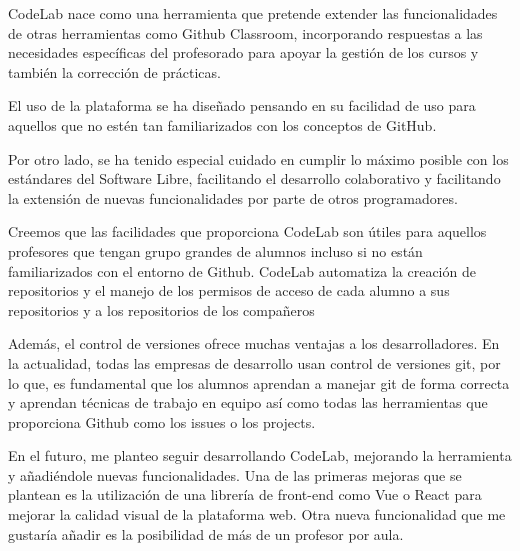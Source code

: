 

CodeLab nace como una herramienta que pretende extender las funcionalidades
de otras herramientas como Github Classroom, incorporando respuestas a las necesidades 
específicas del profesorado para apoyar la gestión de los cursos y
también la corrección de prácticas.

El uso de la plataforma se ha diseñado pensando en su facilidad de
uso para aquellos que no estén tan familiarizados con los conceptos
de GitHub. 

Por otro lado, se ha tenido especial cuidado en cumplir lo máximo
posible con los estándares del Software Libre,
facilitando el desarrollo colaborativo y facilitando 
la extensión de nuevas funcionalidades por parte de otros programadores.

Creemos que las facilidades que proporciona CodeLab son
útiles para aquellos profesores que tengan grupo grandes de
alumnos incluso si no están familiarizados con el entorno de Github.
CodeLab automatiza la creación de repositorios y el manejo
de los permisos de acceso de cada alumno a sus repositorios y a los
repositorios de los compañeros

Además, el control de versiones ofrece muchas ventajas a los
desarrolladores. En la actualidad, todas las empresas de desarrollo
usan control de versiones git, por lo que, es fundamental que los
alumnos aprendan a manejar git de forma correcta y aprendan técnicas
de trabajo en equipo así como todas las herramientas que proporciona
Github como los issues o los projects.

En el futuro, me planteo seguir desarrollando CodeLab, mejorando la herramienta
y añadiéndole nuevas funcionalidades. 
Una de las primeras mejoras
que se plantean es la utilización de una librería de front-end como
Vue o React para mejorar la calidad visual de la plataforma web.
Otra nueva funcionalidad que me gustaría añadir es la posibilidad
de más de un profesor por aula.
